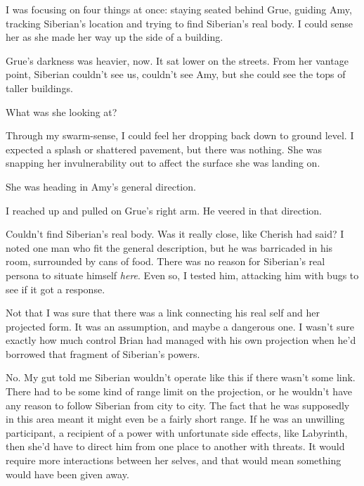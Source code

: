 I was focusing on four things at once: staying seated behind Grue, guiding Amy, tracking Siberian's location and trying to find Siberian's real body.  I could sense her as she made her way up the side of a building.



Grue's darkness was heavier, now.  It sat lower on the streets.  From her vantage point, Siberian couldn't see us, couldn't see Amy, but she could see the tops of taller buildings.



What was she looking at?



Through my swarm-sense, I could feel her dropping back down to ground level.  I expected a splash or shattered pavement, but there was nothing.  She was snapping her invulnerability out to affect the surface she was landing on.



She was heading in Amy's general direction.



I reached up and pulled on Grue's right arm.  He veered in that direction.



Couldn't find Siberian's real body.  Was it really close, like Cherish had said?  I noted one man who fit the general description, but he was barricaded in his room, surrounded by cans of food.  There was no reason for Siberian's real persona to situate himself \emph{here}.  Even so, I tested him, attacking him with bugs to see if it got a response.



Not that I was sure that there was a link connecting his real self and her projected form.  It was an assumption, and maybe a dangerous one.  I wasn't sure exactly how much control Brian had managed with his own projection when he'd borrowed that fragment of Siberian's powers.



No.  My gut told me Siberian wouldn't operate like this if there wasn't some link.  There had to be some kind of range limit on the projection, or he wouldn't have any reason to follow Siberian from city to city.  The fact that he was supposedly in this area meant it might even be a fairly short range.  If he was an unwilling participant, a recipient of a power with unfortunate side effects, like Labyrinth, then she'd have to direct him from one place to another with threats.  It would require more interactions between her selves, and that would mean something would have been given away.



